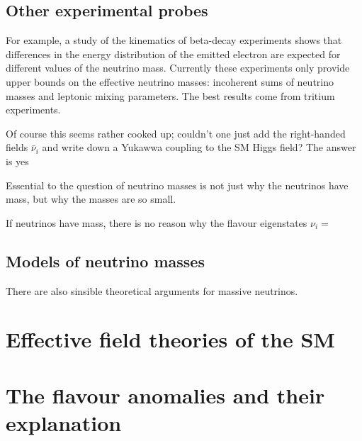 \subsection{Other experimental probes}


For example, a study of the kinematics of beta-decay experiments shows that
differences in the energy distribution of the emitted electron are expected for
different values of the neutrino mass. Currently these experiments only provide
upper bounds on the effective neutrino masses: incoherent sums of neutrino
masses and leptonic mixing parameters. The best results come from tritium
experiments.

Of course this seems rather cooked up; couldn't one just add the right-handed
fields $\bar{\nu}_{i}$ and write down a Yukawwa coupling to the SM Higgs field?
The answer is yes

Essential to the question of neutrino masses is not just why the neutrinos have
mass, but why the masses are so small.

If neutrinos have mass, there is no reason why the flavour eigenstates $\nu_{i} = $

\subsection{Models of neutrino masses}

There are also sinsible theoretical arguments for massive neutrinos.

\section{Effective field theories of the SM}

\lipsum[2]

\section{The flavour anomalies and their explanation}

\lipsum[2]

